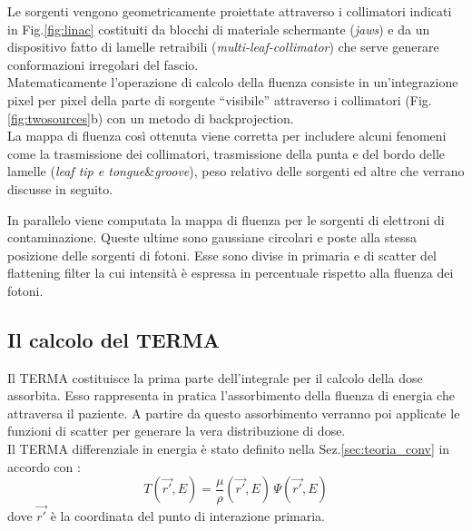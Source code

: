 {Le sorgenti vengono geometricamente proiettate attraverso i collimatori indicati in Fig.\ref{fig:linac} costituiti da blocchi di materiale schermante (\textit{jaws}) e da un dispositivo fatto di lamelle retraibili (\textit{multi-leaf-collimator}) che serve generare conformazioni irregolari del fascio.\\
Matematicamente l'operazione di calcolo della fluenza consiste in un'integrazione pixel per pixel della parte di sorgente \textquotedblleft visibile\textquotedblright{} attraverso i collimatori (Fig.\ref{fig:twosources}b) con un metodo di backprojection.\\
La mappa di fluenza così ottenuta viene corretta per includere alcuni fenomeni come la trasmissione dei collimatori, trasmissione della punta e del bordo delle lamelle (\textit{leaf tip e tongue}\&\textit{groove}), peso relativo delle sorgenti ed altre che verrano discusse in seguito.

In parallelo viene computata la mappa di fluenza per le sorgenti di elettroni di contaminazione. Queste ultime sono gaussiane circolari e poste alla stessa posizione delle sorgenti di fotoni. Esse sono divise in primaria e di scatter del flattening filter la cui intensità è espressa in percentuale rispetto alla fluenza dei fotoni.

\subsection{Il calcolo del TERMA}
Il TERMA costituisce la prima parte dell'integrale per il calcolo della dose assorbita. Esso rappresenta in pratica l'assorbimento della fluenza di energia che attraversa il paziente. A partire da questo assorbimento verranno poi applicate le funzioni di scatter per generare la vera distribuzione di dose.\\
Il TERMA differenziale in energia è stato definito nella Sez.\ref{sec:teoria_conv} in accordo con \cite{Ahnesjo1999}:
\begin{equation}
\label{eq:termaE}
T(\vec{r'},E) = \frac{\mu}{\rho}(\vec{r'},E)\,\Psi(\vec{r'},E)
\end{equation}
dove $\vec{r'}$ è la coordinata del punto di interazione primaria.

}
